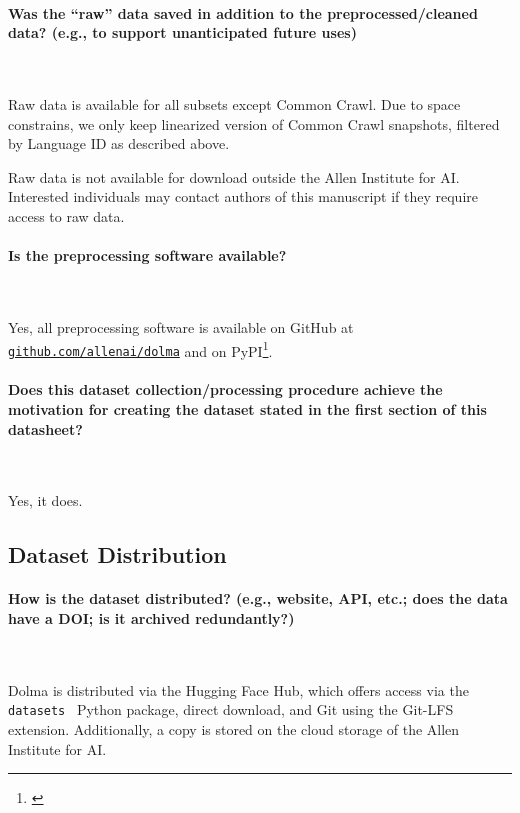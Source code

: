 \documentclass{article}
\newcommand{\dolma}{Dolma\xspace}
\begin{document}
\paragraph{Was the ``raw'' data saved in addition to the preprocessed/cleaned data? (e.g., to support unanticipated future uses)}~

Raw data is available for all subsets except Common Crawl. 
Due to space constrains, we only keep linearized version of Common Crawl snapshots, filtered by Language ID as described above. 

Raw data is not available for download outside the Allen Institute for AI. 
Interested individuals may contact authors of this manuscript if they require access to raw data.

\paragraph{Is the preprocessing software available?}~

Yes, all preprocessing software is available on GitHub at \href{https://github.com/allenai/dolma}{\texttt{github.com/allenai/dolma}} and on PyPI\footnote{\href{https://pypi.org/project/dolma/}{}}.

\paragraph{Does this dataset collection/processing procedure achieve the motivation for creating the dataset stated in the first section of this datasheet?}~

Yes, it does. 

\subsection{Dataset Distribution}

\paragraph{How is the dataset distributed? (e.g., website, API, etc.; does the data have a DOI; is it archived redundantly?)}~

\dolma is distributed via the Hugging Face Hub, which offers access via the \texttt{datasets}~\citep{Lhoest_Datasets_A_Community_2021} Python package, direct download, and Git using the Git-LFS extension.
Additionally, a copy is stored on the cloud storage of 
the Allen Institute for AI.
\end{document}
